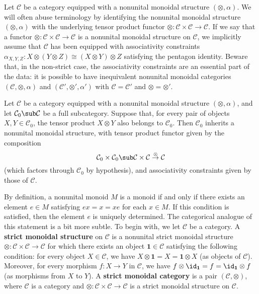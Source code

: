 \begin{remark}
Let $\mathcal{C}$ be a category equipped with a nonunital monoidal structure $(\otimes,\alpha)$. We will often abuse terminology by identifying the nonunital monoidal structure $(\otimes,\alpha)$ with the underlying tensor product functor $\otimes:\mathcal{C}\times\mathcal{C}\to\mathcal{C}$. If we say that a functor $\otimes:\mathcal{C}\times\mathcal{C}\to\mathcal{C}$ is a nonunital monoidal structure on $\mathcal{C}$, we implicitly assume that $\mathcal{C}$ has been equipped with associativity constraints $\alpha_{X,Y,Z}:X\otimes(Y\otimes Z)\cong(X\otimes Y)\otimes Z$ satisfying the pentagon identity. Beware that, in the non-strict case, the associativity constraints are an essential part of the data: it is possible to have inequivalent nonunital monoidal categories $(\mathcal{C},\otimes,\alpha)$ and $(\mathcal{C}',\otimes',\alpha')$ with $\mathcal{C}=\mathcal{C}'$ and $\otimes=\otimes'$.
\end{remark}
\begin{remark}\label{monoidal cat nonunital subcat}
Let $\mathcal{C}$ be a category equipped with a nonunital monoidal structure $(\otimes,\alpha)$, and let $\mathcal{C}_0\sub\mathcal{C}$ be a full subcategory. Suppose that, for every pair of objects $X,Y\in\mathcal{C}_0$, the tensor product $X\otimes Y$ also belongs to $\mathcal{C}_0$. Then $\mathcal{C}_0$ inherits a nonunital monoidal structure, with tensor product functor given by the composition
\[\mathcal{C}_0\times\mathcal{C}_0\sub\mathcal{C}\times\mathcal{C}\stackrel{\otimes}{\to}\mathcal{C}\]
(which factors through $\mathcal{C}_0$ by hypothesis), and associativity constraints given by those of $\mathcal{C}$.
\end{remark}
By definition, a nonunital monoid $M$ is a monoid if and only if there exists an element $e\in M$ satisfying $ex=x=xe$ for each $x\in M$. If this condition is satisfied, then the element $e$ is uniquely determined. The categorical analogue of this statement is a bit more subtle. To begin with, we let $\mathcal{C}$ be a category. A \textbf{strict monoidal structure} on $\mathcal{C}$ is a nonunital strict monoidal structure $\otimes:\mathcal{C}\times\mathcal{C}\to\mathcal{C}$ for which there exists an object $\mathbf{1}\in\mathcal{C}$ satisfying the following condition: for every object $X\in\mathcal{C}$, we have $X\otimes\mathbf{1}=X=\mathbf{1}\otimes X$ (as objects of $\mathcal{C}$). Moreover, for every morphism $f:X\to Y$ in $\mathcal{C}$, we have $f\otimes\id_{\mathbf{1}}=f=\id_{\mathbf{1}}\otimes f$ (as morphisms from $X$ to $Y$). A \textbf{strict monoidal category} is a pair $(\mathcal{C},\otimes)$, where $\mathcal{C}$ is a category and $\otimes:\mathcal{C}\times\mathcal{C}\to\mathcal{C}$ is a strict monoidal structure on $\mathcal{C}$.\par
